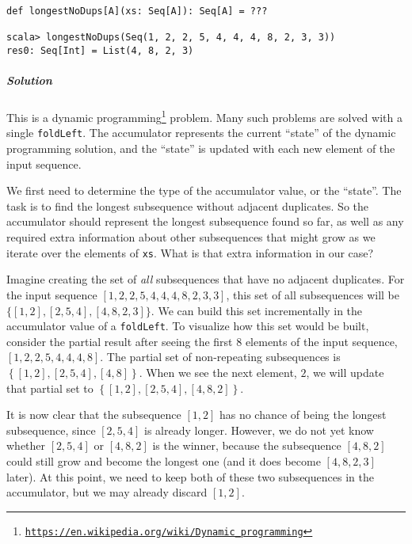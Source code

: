 \begin{lstlisting}
def longestNoDups[A](xs: Seq[A]): Seq[A] = ???

scala> longestNoDups(Seq(1, 2, 2, 5, 4, 4, 4, 8, 2, 3, 3))
res0: Seq[Int] = List(4, 8, 2, 3)
\end{lstlisting}


\subparagraph{Solution}

This is a dynamic programming\footnote{\texttt{\href{https://en.wikipedia.org/wiki/Dynamic_programming}{https://en.wikipedia.org/wiki/Dynamic\_programming}}}
problem. Many such problems are solved with a single \lstinline!foldLeft!.
The accumulator represents the current \textsf{``}state\textsf{''} of the dynamic
programming solution, and the \textsf{``}state\textsf{''} is updated with each new
element of the input sequence.

We first need to determine the type of the accumulator value, or the
\textsf{``}state\textsf{''}. The task is to find the longest subsequence without adjacent
duplicates. So the accumulator should represent the longest subsequence
found so far, as well as any required extra information about other
subsequences that might grow as we iterate over the elements of \lstinline!xs!.
What is that extra information in our case? 

Imagine creating the set of \emph{all} subsequences that have no adjacent
duplicates. For the input sequence $\left[1,2,2,5,4,4,4,8,2,3,3\right]$,
this set of all subsequences will be $\{\left[1,2\right],\left[2,5,4\right],\left[4,8,2,3\right]\}$.
We can build this set incrementally in the accumulator value of a
\lstinline!foldLeft!. To visualize how this set would be built, consider
the partial result after seeing the first $8$ elements of the input
sequence, $\left[1,2,2,5,4,4,4,8\right]$. The partial set of non-repeating
subsequences is $\left\{ \left[1,2\right],\left[2,5,4\right],\left[4,8\right]\right\} $.
When we see the next element, $2$, we will update that partial set
to $\left\{ \left[1,2\right],\left[2,5,4\right],\left[4,8,2\right]\right\} $.

It is now clear that the subsequence $\left[1,2\right]$ has no chance
of being the longest subsequence, since $\left[2,5,4\right]$ is already
longer. However, we do not yet know whether $\left[2,5,4\right]$
or $\left[4,8,2\right]$ is the winner, because the subsequence $\left[4,8,2\right]$
could still grow and become the longest one (and it does become $\left[4,8,2,3\right]$
later). At this point, we need to keep both of these two subsequences
in the accumulator, but we may already discard $\left[1,2\right]$.

